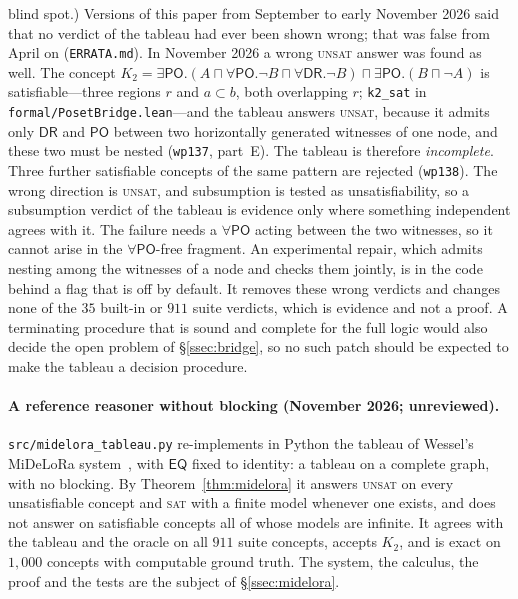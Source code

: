 \documentclass[11pt]{article}
\newcommand{\DR}{\mathsf{DR}}
\newcommand{\PO}{\mathsf{PO}}
\newcommand{\EQ}{\mathsf{EQ}}
\newcommand{\code}[1]{\texttt{#1}}
\theoremstyle{plain}
\theoremstyle{definition}
\begin{document}
blind spot.) Versions of this paper from September to early November 2026 said
that no verdict of the tableau had ever been shown wrong; that was false from
April on (\texttt{ERRATA.md}). In November 2026 a wrong \textsc{unsat} answer
was found as well. The concept
$K_2=\exists\PO.(A\sqcap\forall\PO.\neg B\sqcap\forall\DR.\neg B)\sqcap
\exists\PO.(B\sqcap\neg A)$ is satisfiable---three regions $r$ and
$a\subset b$, both overlapping $r$; \code{k2\_sat} in
\texttt{formal/PosetBridge.lean}---and the tableau answers \textsc{unsat},
because it admits only $\DR$ and $\PO$ between two horizontally generated
witnesses of one node, and these two must be nested (\texttt{wp137},
part~E). The tableau is therefore \emph{incomplete}. Three further satisfiable
concepts of the same pattern are rejected (\texttt{wp138}). The wrong direction
is \textsc{unsat}, and subsumption is tested as unsatisfiability, so a
subsumption verdict of the tableau is evidence only where something independent
agrees with it. The failure needs a $\forall\PO$ acting between the two
witnesses, so it cannot arise in the $\forall\PO$-free fragment. An
experimental repair, which admits nesting among the witnesses of a node and
checks them jointly, is in the code behind a flag that is off by default. It
removes these wrong verdicts and changes none of the $35$ built-in or $911$
suite verdicts, which is evidence and not a proof. A terminating procedure
that is sound and complete for the full logic would also decide the open
problem of \S\ref{ssec:bridge}, so no such patch should be expected to make
the tableau a decision procedure.

\paragraph{A reference reasoner without blocking (November 2026;
unreviewed).} \texttt{src/midelora\_tableau.py} re-implements in Python the
tableau of Wessel's MiDeLoRa system~\cite{Wessel2008}, with $\EQ$ fixed to
identity: a tableau on a complete graph, with no blocking. By
Theorem~\ref{thm:midelora} it answers \textsc{unsat} on every unsatisfiable
concept and \textsc{sat} with a finite model whenever one exists, and does not
answer on satisfiable concepts all of whose models are infinite. It agrees
with the tableau and the oracle on all $911$ suite concepts, accepts $K_2$,
and is exact on $1{,}000$ concepts with computable ground truth. The system,
the calculus, the proof and the tests are the subject of
\S\ref{ssec:midelora}.
\end{document}
